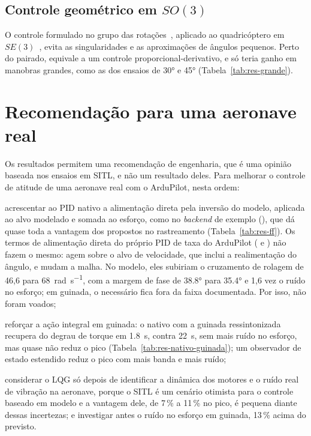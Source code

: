 \subsection{\texorpdfstring{Controle geométrico em $SO(3)$}{Controle geométrico em SO(3)}}

O controle formulado no grupo das
rotações~\cite{bullo1999}, aplicado ao quadricóptero em
$SE(3)$~\cite{lee2010}, evita as singularidades e as aproximações de ângulos
pequenos. Perto do pairado, equivale a um controle proporcional-derivativo, e
só teria ganho em manobras grandes, como as dos ensaios de \ang{30} e
\ang{45} (Tabela~\ref{tab:res-grande}).

\section{Recomendação para uma aeronave real}
\label{sec:recomendacao}

Os resultados permitem uma recomendação de engenharia, que é uma opinião
baseada nos ensaios em SITL, e não um resultado deles. Para melhorar o
controle de atitude de uma aeronave real com o ArduPilot, nesta ordem:
\begin{alineas}
    \item acrescentar ao PID nativo a alimentação direta pela inversão do
          modelo, aplicada ao alvo modelado e somada ao esforço, como no
          \textit{backend} de exemplo (), que dá quase
          toda a vantagem dos propostos no rastreamento
          (Tabela~\ref{tab:res-ff}). Os termos de alimentação direta do
          próprio PID de taxa do ArduPilot ( e )
          não fazem o mesmo: agem sobre o alvo de velocidade, que inclui a
          realimentação do ângulo, e mudam a malha. No modelo, eles subiriam
          o cruzamento de rolagem de 46,6 para \SI{68}{\radian\per\second},
          com a margem de fase de \ang{38.8} para \ang{35.4} e 1,6 vez o
          ruído no esforço; em guinada, o  necessário fica fora
          da faixa documentada. Por isso, não foram voados;
    \item reforçar a ação integral em guinada: o nativo com a guinada
          ressintonizada recupera do degrau de torque em \SI{1.8}{\second},
          contra \SI{22}{\second}, sem mais ruído no esforço, mas quase não
          reduz o pico (Tabela~\ref{tab:res-nativo-guinada}); um observador
          de estado estendido reduz o pico com mais banda e mais ruído;
    \item considerar o LQG só depois de identificar a dinâmica dos motores e
          o ruído real de vibração na aeronave, porque o SITL é um cenário
          otimista para o controle baseado em modelo e a vantagem dele, de
          7\,\% a 11\,\% no pico, é pequena diante dessas incertezas; e
          investigar antes o ruído no esforço em guinada, 13\,\% acima do
          previsto.
\end{alineas}

